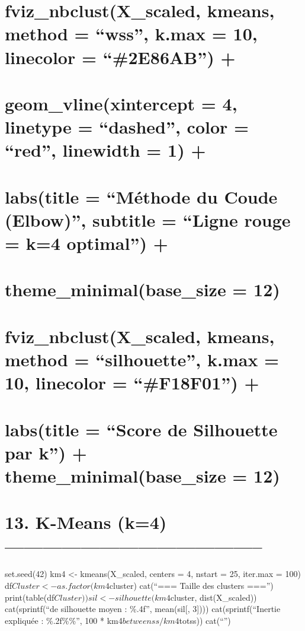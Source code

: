 \documentclass[
]{article}
\begin{document}
\section{fviz\_nbclust(X\_scaled, kmeans, method = ``wss'', k.max = 10,
linecolor = ``\#2E86AB'')
+}\label{fviz_nbclustx_scaled-kmeans-method-wss-k.max-10-linecolor-2e86ab}

\section{geom\_vline(xintercept = 4, linetype = ``dashed'', color =
``red'', linewidth = 1)
+}\label{geom_vlinexintercept-4-linetype-dashed-color-red-linewidth-1}

\section{labs(title = ``Méthode du Coude (Elbow)'', subtitle = ``Ligne
rouge = k=4 optimal'')
+}\label{labstitle-muxe9thode-du-coude-elbow-subtitle-ligne-rouge-k4-optimal}

\section{theme\_minimal(base\_size =
12)}\label{theme_minimalbase_size-12-2}

\section{fviz\_nbclust(X\_scaled, kmeans, method = ``silhouette'', k.max
= 10, linecolor = ``\#F18F01'')
+}\label{fviz_nbclustx_scaled-kmeans-method-silhouette-k.max-10-linecolor-f18f01}

\section{labs(title = ``Score de Silhouette par k'') +
theme\_minimal(base\_size =
12)}\label{labstitle-score-de-silhouette-par-k-theme_minimalbase_size-12}

\section{13. K-Means (k=4)
-----------------------------------------}\label{k-means-k4}

set.seed(42) km4 \textless- kmeans(X\_scaled, centers = 4, nstart = 25,
iter.max = 100) df\(Cluster <- as.factor(km4\)cluster) cat(``=== Taille
des clusters ===\n'') print(table(df\(Cluster))
sil <- silhouette(km4\)cluster, dist(X\_scaled))
cat(sprintf(``\nScore de silhouette moyen : \%.4f\n'', mean(sil{[},
3{]}))) cat(sprintf(``Inertie expliquée : \%.2f\%\%\n'', 100 *
km4\(betweenss / km4\)totss)) cat(``\n'')
\end{document}
